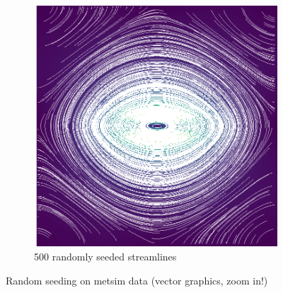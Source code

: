\documentclass{article}
\begin{document}
\begin{figure}[h!]
\begin{subfigure}{0.65\textwidth}
        \includegraphics[width=\textwidth]{metsim_random_500.eps}
        \caption{500 randomly seeded streamlines}
    \end{subfigure}
    \caption{Random seeding on metsim data (vector graphics, zoom in!)}
\end{figure}
\end{document}
